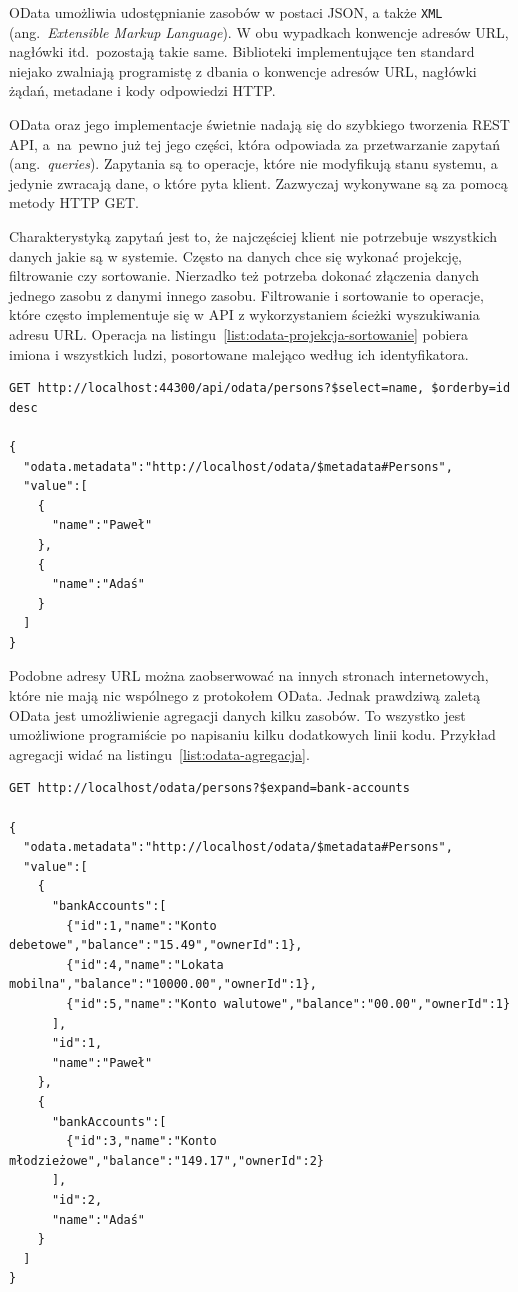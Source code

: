 OData umożliwia udostępnianie zasobów w postaci JSON, a także \texttt{XML} (ang.~\emph{Extensible Markup Language}). W obu wypadkach konwencje adresów URL, nagłówki itd.~pozostają takie same.
Biblioteki implementujące ten standard niejako zwalniają programistę z dbania o konwencje adresów URL, nagłówki żądań, metadane i kody odpowiedzi HTTP. 

OData oraz jego implementacje świetnie nadają się do szybkiego tworzenia REST API, a~na~pewno już tej jego części, która odpowiada za przetwarzanie zapytań (ang.~\emph{queries}). Zapytania są to operacje, które nie modyfikują stanu systemu, a jedynie zwracają dane, o które pyta klient. Zazwyczaj wykonywane są za pomocą metody HTTP GET. 

Charakterystyką zapytań jest to, że najczęściej klient nie potrzebuje wszystkich danych jakie są w systemie. Często na danych chce się wykonać projekcję, filtrowanie czy sortowanie. Nierzadko też potrzeba dokonać złączenia danych jednego zasobu z danymi innego zasobu. Filtrowanie i sortowanie to operacje, które często implementuje się w API z wykorzystaniem ścieżki wyszukiwania adresu URL. Operacja na listingu~\ref{list:odata-projekcja-sortowanie} pobiera imiona i wszystkich ludzi, posortowane malejąco według ich identyfikatora.

\begin{lstlisting}[label=list:odata-projekcja-sortowanie,
    caption=OData -- przykład projekcji i sortowania]
GET http://localhost:44300/api/odata/persons?$select=name, $orderby=id desc

{
  "odata.metadata":"http://localhost/odata/$metadata#Persons",
  "value":[
    {
      "name":"Paweł"
    },
    {
      "name":"Adaś"
    }
  ]
}
\end{lstlisting}

Podobne adresy URL można zaobserwować na innych stronach internetowych, które nie mają nic wspólnego z protokołem OData. Jednak prawdziwą zaletą OData jest umożliwienie agregacji danych kilku zasobów. To wszystko jest umożliwione programiście po napisaniu kilku dodatkowych linii kodu. Przykład agregacji widać na listingu~\ref{list:odata-agregacja}.

\begin{lstlisting}[label=list:odata-agregacja,
    caption=OData -- przykład agregacji danych]
GET http://localhost/odata/persons?$expand=bank-accounts

{
  "odata.metadata":"http://localhost/odata/$metadata#Persons",
  "value":[
    {
      "bankAccounts":[
        {"id":1,"name":"Konto debetowe","balance":"15.49","ownerId":1},
        {"id":4,"name":"Lokata mobilna","balance":"10000.00","ownerId":1},
        {"id":5,"name":"Konto walutowe","balance":"00.00","ownerId":1}
      ],
      "id":1,
      "name":"Paweł"
    },
    {
      "bankAccounts":[
        {"id":3,"name":"Konto młodzieżowe","balance":"149.17","ownerId":2}
      ],
      "id":2,
      "name":"Adaś"
    }
  ]
}
\end{lstlisting}

